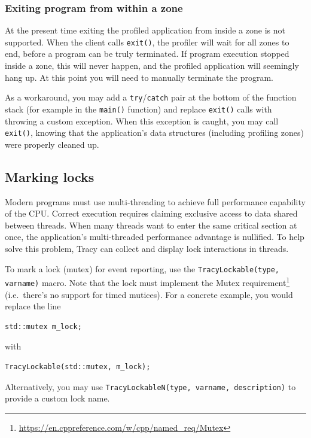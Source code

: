 \documentclass[hidelinks,titlepage,a4paper]{article}
\begin{document}
\subsubsection{Exiting program from within a zone}

At the present time exiting the profiled application from inside a zone is not supported. When the client calls \texttt{exit()}, the profiler will wait for all zones to end, before a program can be truly terminated. If program execution stopped inside a zone, this will never happen, and the profiled application will seemingly hang up. At this point you will need to manually terminate the program.

As a workaround, you may add a \texttt{try}/\texttt{catch} pair at the bottom of the function stack (for example in the \texttt{main()} function) and replace \texttt{exit()} calls with throwing a custom exception. When this exception is caught, you may call \texttt{exit()}, knowing that the application's data structures (including profiling zones) were properly cleaned up.

\subsection{Marking locks}

Modern programs must use multi-threading to achieve full performance capability of the CPU. Correct execution requires claiming exclusive access to data shared between threads. When many threads want to enter the same critical section at once, the application's multi-threaded performance advantage is nullified. To help solve this problem, Tracy can collect and display lock interactions in threads.

To mark a lock (mutex) for event reporting, use the \texttt{TracyLockable(type, varname)} macro. Note that the lock must implement the Mutex requirement\footnote{\url{https://en.cppreference.com/w/cpp/named_req/Mutex}} (i.e.\ there's no support for timed mutices). For a concrete example, you would replace the line

\begin{lstlisting}
std::mutex m_lock;
\end{lstlisting}

with

\begin{lstlisting}
TracyLockable(std::mutex, m_lock);
\end{lstlisting}

Alternatively, you may use \texttt{TracyLockableN(type, varname, description)} to provide a custom lock name.
\end{document}
